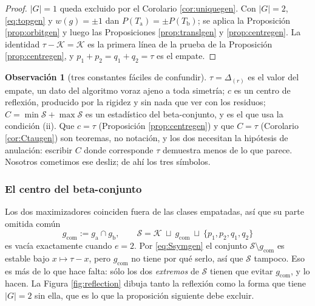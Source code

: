 \documentclass[11pt,reqno]{amsart}
\theoremstyle{plain}
\theoremstyle{definition}
\newtheorem{remark}[theorem]{Observación}
\begin{document}
\begin{proof}
$|G|=1$ queda excluido por el Corolario \ref{cor:uniquegen}. Con $|G|=2$, \eqref{eq:topgen} y
$w(g)=\pm1$ dan $P(T_{\mathrm a})=\pm P(T_{\mathrm b})$; se aplica la Proposición
\ref{prop:orbitgen} y luego las Proposiciones \ref{prop:translgen} y \ref{prop:centregen}. La
identidad $\tau-\mathcal{K}=\mathcal{K}$ es la primera línea de la prueba de la Proposición
\ref{prop:centregen}, y $p_1+p_2=q_1+q_2=\tau$ es el empate.
\end{proof}

\begin{remark}[tres constantes fáciles de confundir]
$\tau=\Delta_{(r)}$ es el valor del empate, un dato del algoritmo voraz ajeno a toda simetría; $c$ es
un centro de reflexión, producido por la rigidez y sin nada que ver con los residuos;
$C=\min\mathcal{S}+\max\mathcal{S}$ es un estadístico del beta-conjunto, y es el que usa la condición
\textup{(ii)}. Que $c=\tau$ \textup{(}Proposición \ref{prop:centregen}\textup{)} y que $C=\tau$
\textup{(}Corolario \ref{cor:Ctaugen}\textup{)} son teoremas, no notación, y los dos necesitan la
hipótesis de anulación: escribir $C$ donde corresponde $\tau$ demuestra menos de lo que parece.
Nosotros cometimos ese desliz; de ahí los tres símbolos.
\end{remark}

\subsubsection*{El centro del beta-conjunto}

Los dos maximizadores coinciden fuera de las clases empatadas, así que su parte omitida común
\begin{equation}\label{eq:gcomgen}
  g_{\mathrm{com}}:=g_{\mathrm a}\cap g_{\mathrm b},\qquad
  \mathcal{S}=\mathcal{K}\ \sqcup\ g_{\mathrm{com}}\ \sqcup\ \{p_1,p_2,q_1,q_2\}
\end{equation}
es vacía exactamente cuando $e=2$. Por \eqref{eq:Ssymgen} el conjunto
$\mathcal{S}\setminus g_{\mathrm{com}}$ es estable bajo $x\mapsto\tau-x$, pero $g_{\mathrm{com}}$ no
tiene por qué serlo, así que $\mathcal{S}$ tampoco. Eso es más de lo que hace falta: sólo los dos
\emph{extremos} de $\mathcal{S}$ tienen que evitar $g_{\mathrm{com}}$, y lo hacen. La Figura
\ref{fig:reflection} dibuja tanto la reflexión como la forma que tiene $|G|=2$ sin ella, que es lo
que la proposición siguiente debe excluir.
\end{document}

